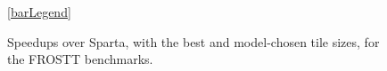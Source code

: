 \begin{figure}%
    \ref{barLegend}
    \centering
    
    
    
    \caption{Speedups over Sparta, with the best and model-chosen tile sizes, for the FROSTT benchmarks.}
    \label{fig::barFigures}
\end{figure}
